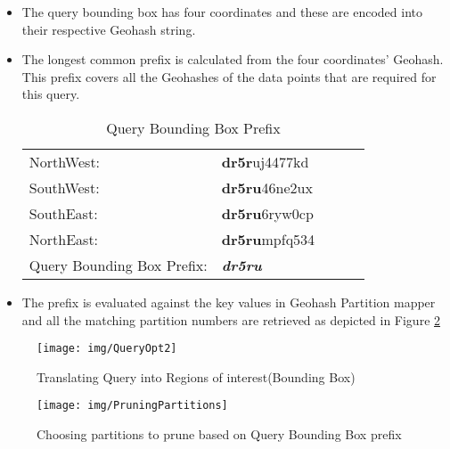 \documentclass[article,type=msc,colorback,10pt,accentcolor=tud1d]{tudthesis}
\begin{document}
			\begin{itemize}
				\item The query bounding box has four coordinates and these are encoded into their respective Geohash string.
				\item The longest common prefix is calculated from the four coordinates' Geohash. This prefix covers all the Geohashes of the data points that are required for this query. 
				
					\begin{table}[h]
						\centering
						\begin{tabular}[htbp]{llllc}
						\\	\hline 
							NorthWest:           & \textbf{dr5r}uj4477kd       \\
							SouthWest:          & \textbf{dr5ru}46ne2ux       \\
							SouthEast:          & \textbf{dr5ru}6ryw0cp     \\ 
							NorthEast:          & \textbf{dr5ru}mpfq534     \\ \hline 
							Query Bounding Box Prefix: & \textit{\textbf{dr5ru}}\\
							\hline
						\end{tabular}
						\caption{Query Bounding Box Prefix}
						\label{tab:Query Bounding Box Prefix}
					\end{table}
				
				\item The prefix is evaluated against the key values in Geohash Partition mapper and all the matching partition numbers are retrieved as depicted in Figure \ref{fig:PruningPartitions}
			\end{itemize}
			
				\clearpage	
					\begin{figure}[p]
					\centering
					\texttt{[image: img/QueryOpt2]}
					\caption{Translating Query into Regions of interest(Bounding Box)}
					\label{fig:QueryOpt2}
					\end{figure}
				
			
					\begin{figure}[p]
						\centering
						\texttt{[image: img/PruningPartitions]}
						\caption{Choosing partitions to prune based on Query Bounding Box prefix}
						\label{fig:PruningPartitions}
					\end{figure}		
			
		\clearpage
\end{document}
